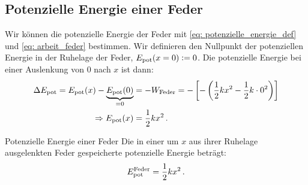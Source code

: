 \subsection{Potenzielle Energie einer Feder}\label{subsec: potentielle_energie_feder}
Wir können die potenzielle Energie der Feder mit \cref{eq: potenzielle_energie_def} und \cref{eq: arbeit_feder} bestimmen. Wir definieren den Nullpunkt der potenziellen Energie in der Ruhelage der Feder, \gDh $E_{\text{pot}}(x=0) \vcentcolon= 0$. Die potenzielle Energie bei einer Auslenkung von $0$ nach $x$ ist dann:
\begin{align*}
    \Delta E_{\text{pot}} = E_{\text{pot}}(x) - \underbrace{E_{\text{pot}}(0)}_{=0} &= -W_{\text{Feder}} = -\left[-\left( \frac{1}{2}k x^2 - \frac{1}{2}k \cdot 0^2 \right)\right] \\
    \Rightarrow E_{\text{pot}}(x) &= \frac{1}{2}kx^2 \,.
\end{align*}

\begin{rememberbox}{Potenzielle Energie einer Feder}
    Die in einer um $x$ aus ihrer Ruhelage ausgelenkten Feder gespeicherte potenzielle Energie beträgt:
    \begin{equation}\label{eq: potenzielle_energie_feder}
        E_{\text{pot}}^{\text{Feder}} = \frac{1}{2}kx^2 \,.
    \end{equation}
\end{rememberbox}

